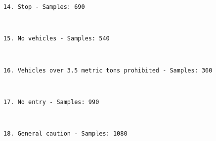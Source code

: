 \documentclass[11pt]{article}
\begin{document}
    \begin{Verbatim}[commandchars=\\\{\}]
14. Stop - Samples: 690

    \end{Verbatim}

    \begin{center}
    \end{center}
    { \hspace*{\fill} \\}
    
    \begin{Verbatim}[commandchars=\\\{\}]
15. No vehicles - Samples: 540

    \end{Verbatim}

    \begin{center}
    \end{center}
    { \hspace*{\fill} \\}
    
    \begin{Verbatim}[commandchars=\\\{\}]
16. Vehicles over 3.5 metric tons prohibited - Samples: 360

    \end{Verbatim}

    \begin{center}
    \end{center}
    { \hspace*{\fill} \\}
    
    \begin{Verbatim}[commandchars=\\\{\}]
17. No entry - Samples: 990

    \end{Verbatim}

    \begin{center}
    \end{center}
    { \hspace*{\fill} \\}
    
    \begin{Verbatim}[commandchars=\\\{\}]
18. General caution - Samples: 1080

    \end{Verbatim}
\end{document}
